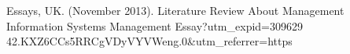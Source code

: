 \documentclass[11pt,a4paper,twoside,openright]{report}
\begin{document}
\maketitle
\committeepage


\StartPrelim
\begin{singlespace}
  \cleardoublepage
  \tableofcontents
  \cleardoublepage
  \listoffigures
  \cleardoublepage
  \listoftables
\end{singlespace}

\StartBody

 




\appendix



\begin{singlespace}
  Essays, UK. (November 2013). Literature Review About Management Information Systems Management Essay?utm_expid=309629 42.KXZ6CCs5RRCgVDyVYVWeng.0&utm_referrer=https%

  \PrintIndex
\end{singlespace}
\end{document}
